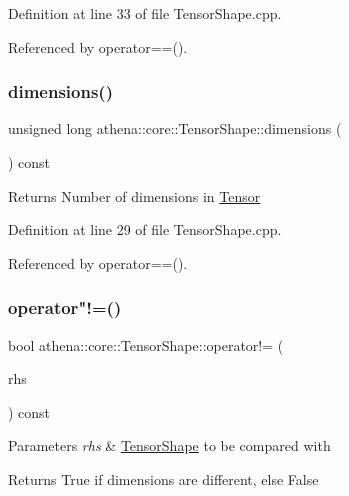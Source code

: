 Definition at line 33 of file Tensor\+Shape.\+cpp.



Referenced by operator==().

\mbox{\label{classathena_1_1core_1_1_tensor_shape_a73f686650f41bd7fa065aa16dfc4529f}} 
\subsubsection{\texorpdfstring{dimensions()}{dimensions()}}
{\footnotesize\ttfamily unsigned long athena\+::core\+::\+Tensor\+Shape\+::dimensions (\begin{DoxyParamCaption}{ }\end{DoxyParamCaption}) const}

\begin{DoxyReturn}{Returns}
Number of dimensions in \mbox{\hyperlink{classathena_1_1core_1_1_tensor}{Tensor}} 
\end{DoxyReturn}


Definition at line 29 of file Tensor\+Shape.\+cpp.



Referenced by operator==().

\mbox{\label{classathena_1_1core_1_1_tensor_shape_acdb5b20f9922cb4d7ee29a868fd05b1b}} 
\subsubsection{\texorpdfstring{operator"!=()}{operator!=()}}
{\footnotesize\ttfamily bool athena\+::core\+::\+Tensor\+Shape\+::operator!= (\begin{DoxyParamCaption}\item[{const \mbox{\hyperlink{classathena_1_1core_1_1_tensor_shape}{Tensor\+Shape}} \&}]{rhs }\end{DoxyParamCaption}) const}


\begin{DoxyParams}{Parameters}
{\em rhs} & \mbox{\hyperlink{classathena_1_1core_1_1_tensor_shape}{Tensor\+Shape}} to be compared with \\
\hline
\end{DoxyParams}
\begin{DoxyReturn}{Returns}
True if dimensions are different, else False 
\end{DoxyReturn}


